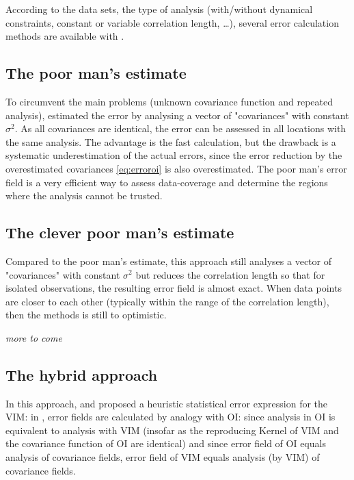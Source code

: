 According to the data sets, the type of analysis (with/without dynamical constraints, constant or variable correlation length, \ldots), several error calculation methods are available with \diva. 

\subsection{The poor man's estimate\label{sec:poormans}}

To circumvent the main problems (unknown covariance function and repeated analysis), \citet{BRASSEUR94} estimated the error by analysing a vector of "covariances" with constant $\sigma^2$. As all covariances are identical, the error can be assessed in all locations with the same analysis. The advantage is the fast calculation, but the drawback is a systematic underestimation of the actual errors, since the error reduction by the overestimated covariances \eqref{eq:erroroi} is also overestimated. The poor man's error field is a very efficient way to assess data-coverage and determine the regions where the analysis cannot be trusted.

\subsection{The clever poor man's estimate\label{sec:cleverpoormans}}

Compared to the poor man's estimate, this approach still analyses a vector of "covariances" with constant $\sigma^2$ but reduces the correlation length so that for isolated observations, the resulting error field is almost exact. When data points are closer to each other (typically within the range of the correlation length), then the methods is still to optimistic.

{\it more to come}

\subsection{The hybrid approach}

In this approach, \citet{BRANKART98} and \citet{RIXEN00} proposed a heuristic statistical error expression for the VIM: in \diva, error fields are calculated by analogy with OI: since analysis in OI is equivalent to analysis with VIM (insofar as the reproducing Kernel of VIM and the covariance function of OI are identical) and since error field of OI equals analysis of covariance fields, error field of VIM equals analysis (by VIM) of covariance fields.

